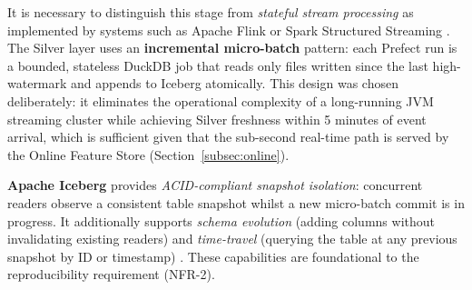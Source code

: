   It is necessary to distinguish this stage from \textit{stateful stream                                                                                  
  processing} as implemented by systems such as Apache Flink                                                                                              
  \cite{flink_paper} or Spark Structured Streaming \cite{spark_streaming}.                                                                                
  The Silver layer uses an \textbf{incremental micro-batch} pattern: each
  Prefect run is a bounded, stateless DuckDB job that reads only files                                                                                    
  written since the last high-watermark and appends to Iceberg atomically.                                                                                
  This design was chosen deliberately: it eliminates the operational                                                                                      
  complexity of a long-running JVM streaming cluster while achieving Silver                                                                               
  freshness within 5 minutes of event arrival, which is sufficient given                                                                                  
  that the sub-second real-time path is served by the Online Feature Store                                                                                
  (Section~\ref{subsec:online}).                                                                                                                          
                                                                                                                                                          
  \textbf{Apache Iceberg} provides \textit{ACID-compliant snapshot isolation}:                                                                            
  concurrent readers observe a consistent table snapshot whilst a new                                                                                     
  micro-batch commit is in progress. It additionally supports                                                                                             
  \textit{schema evolution} (adding columns without invalidating existing                                                                                 
  readers) and \textit{time-travel} (querying the table at any previous                                                                                   
  snapshot by ID or timestamp) \cite{iceberg_paper}. These capabilities                                                                                   
  are foundational to the reproducibility requirement (NFR-2).                                                                                            
                                                                                                                                                          
